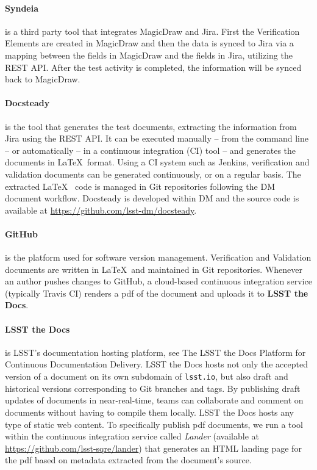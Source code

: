 \paragraph{Syndeia}
is a third party tool that integrates MagicDraw and Jira. 
First the Verification Elements are created in MagicDraw and then the data is synced to Jira
via a mapping between the fields in MagicDraw and the fields in Jira, utilizing the REST API.
After the test activity is completed, the information will be synced back to MagicDraw.

\paragraph{Docsteady}
is the tool that generates the test documents, extracting the information from Jira using the REST API.
It can be executed manually -- from the command line -- or automatically -- in a continuous integration (CI) tool --
and generates the documents in \LaTeX~format.
Using a CI system such as Jenkins, verification and validation documents can be generated continuously, or on a regular basis.
The extracted \LaTeX~ code is managed in Git repositories following the DM document workflow.
Docsteady is developed within DM and the source code is available at \url{https://github.com/lsst-dm/docsteady}.

\paragraph{GitHub}
is the platform used for software version management.
Verification and Validation documents are written in \LaTeX~and maintained in Git repositories.
Whenever an author pushes changes to GitHub, a cloud-based continuous integration service 
(typically Travis CI) renders a pdf of the document and uploads it to \textbf{LSST the Docs}.

\paragraph{LSST the Docs}
is LSST's documentation hosting platform, see The LSST the Docs Platform for Continuous Documentation Delivery\cite{SQR-006}.
LSST the Docs hosts not only the accepted version of a document on its own subdomain of \texttt{lsst.io}, but also draft and
historical versions corresponding to Git branches and tags.
By publishing draft updates of documents in near-real-time, teams can collaborate and comment on documents without having to
compile them locally.
LSST the Docs hosts any type of static web content.
To specifically publish pdf documents, we run a tool within the continuous integration service called \textit{Lander}
(available at \url{https://github.com/lsst-sqre/lander})
that generates an HTML landing page for the pdf based on metadata extracted from the document's source.

